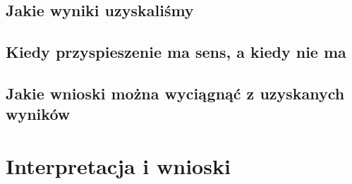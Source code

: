 \documentclass[12pt,a4paper]{article}
\begin{document}
\subsection{Jakie wyniki uzyskaliśmy}

\subsection{Kiedy przyspieszenie ma sens, a kiedy nie ma}
\subsection{Jakie wnioski można wyciągnąć z uzyskanych wyników}

\section{Interpretacja i wnioski}

\printbibliography[heading=bibintoc]
\end{document}

